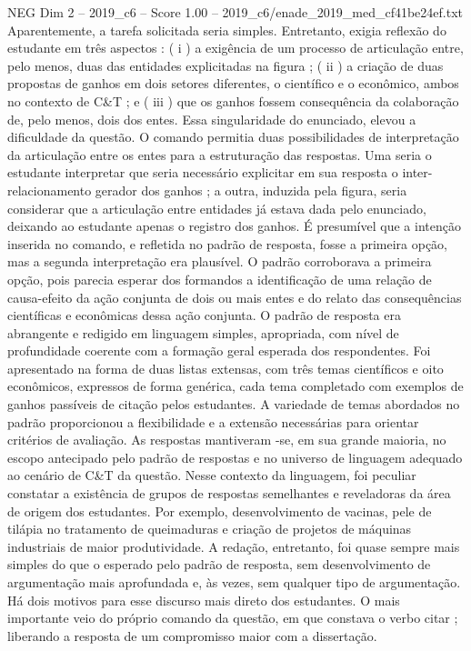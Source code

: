 \begin{textsample}{NEG Dim 2 – 2019\_c6 – Score 1.00 – 2019\_c6/enade\_2019\_med\_cf41be24ef.txt}
Aparentemente, a tarefa solicitada seria simples.
Entretanto, exigia reflexão do estudante em três aspectos : ( i ) a exigência de um processo de articulação entre, pelo menos, duas das entidades explicitadas na figura ; ( ii ) a criação de duas propostas de ganhos em dois setores diferentes, o científico e o econômico, ambos no contexto de C\&T ; e ( iii ) que os ganhos fossem consequência da colaboração de, pelo menos, dois dos entes.
Essa singularidade do enunciado, elevou a dificuldade da questão.
O comando permitia duas possibilidades de interpretação da articulação entre os entes para a estruturação das respostas.
Uma seria o estudante interpretar que seria necessário explicitar em sua resposta o inter-relacionamento gerador dos ganhos ; a outra, induzida pela figura, seria considerar que a articulação entre entidades já estava dada pelo enunciado, deixando ao estudante apenas o registro dos ganhos.
É presumível que a intenção inserida no comando, e refletida no padrão de resposta, fosse a primeira opção, mas a segunda interpretação era plausível.
O padrão corroborava a primeira opção, pois parecia esperar dos formandos a identificação de uma relação de causa-efeito da ação conjunta de dois ou mais entes e do relato das consequências científicas e econômicas dessa ação conjunta.
O padrão de resposta era abrangente e redigido em linguagem simples, apropriada, com nível de profundidade coerente com a formação geral esperada dos respondentes.
Foi apresentado na forma de duas listas extensas, com três temas científicos e oito econômicos, expressos de forma genérica, cada tema completado com exemplos de ganhos passíveis de citação pelos estudantes.
A variedade de temas abordados no padrão proporcionou a flexibilidade e a extensão necessárias para orientar critérios de avaliação.
As respostas mantiveram -se, em sua grande maioria, no escopo antecipado pelo padrão de respostas e no universo de linguagem adequado ao cenário de C\&T da questão.
Nesse contexto da linguagem, foi peculiar constatar a existência de grupos de respostas semelhantes e reveladoras da área de origem dos estudantes.
Por exemplo, desenvolvimento de vacinas, pele de tilápia no tratamento de queimaduras e criação de projetos de máquinas industriais de maior produtividade.
A redação, entretanto, foi quase sempre mais simples do que o esperado pelo padrão de resposta, sem desenvolvimento de argumentação mais aprofundada e, às vezes, sem qualquer tipo de argumentação.
Há dois motivos para esse discurso mais direto dos estudantes.
O mais importante veio do próprio comando da questão, em que constava o verbo citar ; liberando a resposta de um compromisso maior com a dissertação.

\end{textsample}
